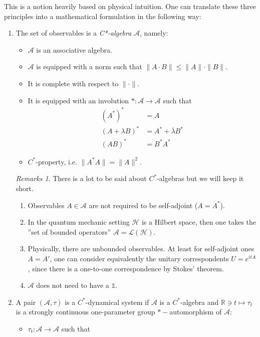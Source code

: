 \documentclass[
a4paper, %
11pt, %
onecolumn, %
openany, %
]{memoir}
\theoremstyle{definition}
\theoremstyle{remark}
\newtheorem{remarks}[definition]{Remarks}
\theoremstyle{plain}
\begin{document}
This is a notion heavily based on physical intuition. One can translate these three principles into a mathematical formulation in the following way: \begin{enumerate}
	\item The set of observables is a \textit{C*-algebra} $\mathcal{A}$, namely: \begin{itemize}
		\item $\mathcal{A}$ is an associative algebra.
		\item $\mathcal{A}$ is equipped with a norm such that $\|A\cdot B\| \leq \| A \|\cdot \| B\| $.
		\item It is complete with respect to $\| \cdot \|$.
		\item It is equipped with an involution $*:\mathcal{A}\rightarrow \mathcal{A}$ such that \begin{align}
		(A^*)^*&=A\\
		(A+\lambda B)^* &= A^* +\overline{\lambda}B^*\\
		(AB)^*&=B^*A^*
		\end{align}
		\item $C^*$-property, i.e. $\|A^*A\|=\|A\|^2$.
	\end{itemize}
\begin{remarks}
	There is a lot to be said about $C^*$-algebras but we will keep it short. \begin{enumerate}
		\item Observables $A\in\mathcal{A}$ are not required to be self-adjoint ($A=A^*$).
		\item In the quantum mechanic setting $\mathcal{H}$ is a Hilbert space, then one takes the ''set of bounded operators'' $\mathcal{A}=\mathcal{L}(\mathcal{H})$.
		\item Physically, there are unbounded observables. At least for self-adjoint ones $A=A'$, one can consider equivalently the unitary correspondents $U=e^{itA}$, since there is a one-to-one correspondence by Stokes' theorem.
		\item $\mathcal{A}$ does not need to have a $\mathds{1}$.
	\end{enumerate}
\end{remarks}
\item A pair $(\mathcal{A},\tau)$ is a $C^*$-dynamical system if $\mathcal{A}$ is a $C^*$-algebra and $\mathbb{R}\ni t\mapsto \tau_t$ is a strongly continuous one-parameter group $*-$automorphism of $\mathcal{A}$: \begin{itemize}
	\item $\tau_t:\mathcal{A}\rightarrow \mathcal{A}$ such that \begin{align}

\end{align}
\end{itemize}
\end{enumerate}
\end{document}
